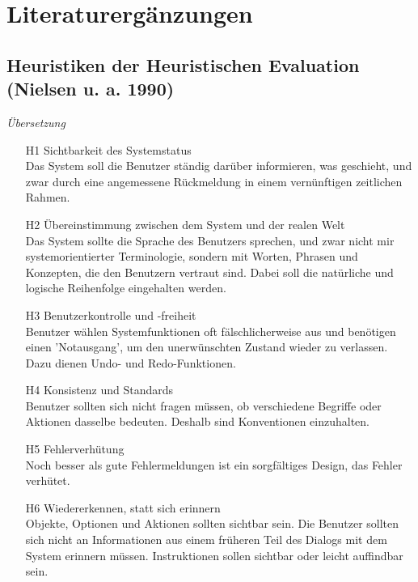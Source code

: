 \glsresetall
\chapter{Literaturergänzungen}

\section[Heuristiken der Heuristischen Evaluation]{Heuristiken der Heuristischen Evaluation (Nielsen u. a. 1990)}
\label{app:heuristiken}

\textit{Übersetzung \citep[][S. 101]{Schweibenz:2003tu}}

\begin{enumerate}
    \item[H1] Sichtbarkeit des Systemstatus
        \\Das System soll die Benutzer ständig darüber informieren, was geschieht, und zwar durch eine angemessene Rückmeldung in einem vernünftigen zeitlichen Rahmen.
    \item[H2] Übereinstimmung zwischen dem System und der realen Welt
        \\Das System sollte die Sprache des Benutzers sprechen, und zwar nicht mir systemorientierter Terminologie, sondern mit Worten, Phrasen und Konzepten, die den Benutzern vertraut sind. Dabei soll die natürliche und logische Reihenfolge eingehalten werden.
    \item[H3] Benutzerkontrolle und -freiheit
        \\Benutzer wählen Systemfunktionen oft fälschlicherweise aus und benötigen einen 'Notausgang', um den unerwünschten Zustand wieder zu verlassen. Dazu dienen Undo- und Redo-Funktionen.
    \item[H4] Konsistenz und Standards
        \\Benutzer sollten sich nicht fragen müssen, ob verschiedene Begriffe oder Aktionen dasselbe bedeuten. Deshalb sind Konventionen einzuhalten.
    \item[H5] Fehlerverhütung
        \\Noch besser als gute Fehlermeldungen ist ein sorgfältiges Design, das Fehler verhütet.
    \item[H6] Wiedererkennen, statt sich erinnern
        \\Objekte, Optionen und Aktionen sollten sichtbar sein. Die Benutzer sollten sich nicht an Informationen aus einem früheren Teil des Dialogs mit dem System erinnern müssen. Instruktionen sollen sichtbar oder leicht auffindbar sein.

\end{enumerate}
